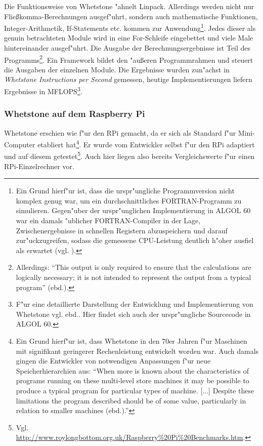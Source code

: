 Die Funktionsweise von Whetstone "ahnelt Linpack. Allerdings werden nicht nur Flie\ss komma-Berechnungen ausgef"uhrt, sondern auch mathematische Funktionen, Integer-Arithmetik, If-Statements etc. kommen zur Anwendung\footnote{Ein Grund hierf"ur ist, dass die urspr"ungliche Programmversion nicht komplex genug war, um ein durchschnittliches FORTRAN-Programm zu simulieren. Gegen"uber der urspr"unglichen Implementierung in ALGOL 60 war ein damals "ublicher FORTRAN-Compiler in der Lage, Zwischenergebnisse in schnellen Registern abzuspeichern und darauf zur"uckzugreifen, sodass die gemessene CPU-Leistung deutlich h"oher ausfiel als erwartet (vgl. \cite{cur76}).}. Jedes dieser als genuin betrachteten Module wird in eine For-Schleife eingebettet und viele Male  hintereinander ausgef"uhrt. Die Ausgabe der Berechnungsergebnisse ist Teil des Programms\footnote{Allerdings: "`This output is only required to ensure that the calculations are logically necessary; it is not intended to represent the output from a typical program"' (ebd.).}. Ein Framework bildet den "au\ss eren Programmrahmen und steuert die Ausgaben der einzelnen Module. Die Ergebnisse wurden zun"achst in \textit{Whetstone Instructions per Second} gemessen, heutige Implementierungen liefern Ergebnisse in MFLOPS\footnote{F"ur eine detaillierte Darstellung der Entwicklung und Implementierung von Whetstone vgl. ebd.. Hier findet sich auch der urspr"ungliche Sourcecode in ALGOL 60.}. 


\subsubsection{Whetstone auf dem Raspberry Pi}\label{Whetstone RPi}

Whetstone erschien wie f"ur den RPi gemacht, da er sich als Standard f"ur Mini-Computer etabliert hat\footnote{Ein Grund hierf"ur ist, dass Whetstone in den 70er Jahren f"ur Maschinen mit signifikant geringerer Rechenleistung entwickelt worden war. Auch damals gingen die Entwickler von notwendigen Anpassungen f"ur neue Speicherhierarchien aus: "`When more is known about the characteristics of programs running on these multi-level store machines it may be possible to produce a typical program for particular types of machine. [...] Despite these limitations the program described should be of some value, particularly in relation to smaller machines (ebd.)."'}. Er wurde vom Entwickler selbst f"ur den RPi adaptiert und auf diesem getestet\footnote{Vgl. \url{http://www.roylongbottom.org.uk/Raspberry\%20Pi\%20Benchmarks.htm}.}. Auch hier liegen also bereits Vergleichswerte f"ur einen RPi-Einzelrechner vor. 

